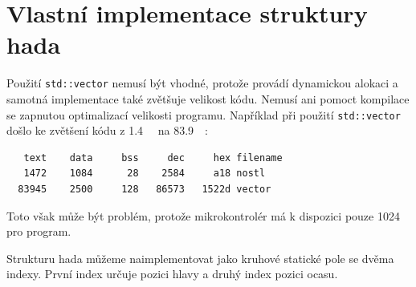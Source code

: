 \documentclass[12pt]{article}
\begin{document}
\section{Vlastní implementace struktury hada}
Použití \texttt{std::vector} nemusí být vhodné, protože provádí dynamickou alokaci a samotná implementace také zvětšuje velikost kódu.
Nemusí ani pomoct kompilace se zapnutou optimalizací velikosti programu.
Například při použití \texttt{std::vector} došlo ke zvětšení kódu z \SI{1.4}{\kilo\byte} na \SI{83.9}{\kilo \byte}:
\begin{verbatim}
   text    data     bss     dec     hex filename
   1472    1084      28    2584     a18 nostl
  83945    2500     128   86573   1522d vector
\end{verbatim}
Toto však může být problém, protože mikrokontrolér má k dispozici pouze \SI{1024}{\kilo\byte} pro program.

Strukturu hada můžeme naimplementovat jako kruhové statické pole se dvěma indexy.
První index určuje pozici hlavy a druhý index pozici ocasu.
\end{document}
